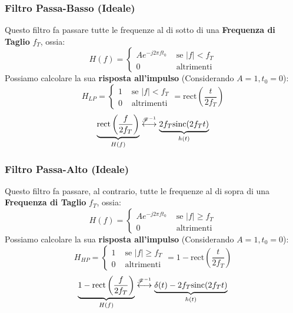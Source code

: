 \subsubsection{Filtro Passa-Basso (Ideale)}
Questo filtro fa passare tutte le frequenze al di sotto di una \textbf{Frequenza di Taglio} $f_T$, ossia:
\begin{equation}
    H(f) = \begin{cases}
        Ae^{-j2\pi ft_0} & \text{ se } |f| < f_T\\
        0 & \text{ altrimenti}
    \end{cases}
\end{equation}
Possiamo calcolare la sua \textbf{risposta all'impulso} (Considerando $A = 1, t_0 = 0$):
\begin{equation*}
    H_{LP} = \begin{cases}
        1 & \text{ se } |f| < f_T\\
        0 & \text{ altrimenti}
    \end{cases} = \text{rect}\left(\frac{t}{2f_T}\right)
\end{equation*}
\begin{equation*}
    \underbrace{\text{rect}\left(\frac{f}{2f_T}\right)}_{H(f)} \overset{{\mathscr{F}}^{-1}}{\longleftrightarrow} \underbrace{2f_T\text{sinc}(2f_Tt)}_{h(t)}
\end{equation*}

\subsubsection{Filtro Passa-Alto (Ideale)}
Questo filtro fa passare, al contrario, tutte le frequenze al di sopra di una \textbf{Frequenza di Taglio} $f_T$, ossia:
\begin{equation}
    H(f) = \begin{cases}
        Ae^{-j2\pi ft_0} & \text{ se } |f| \geq f_T\\
        0 & \text{ altrimenti}
    \end{cases}
\end{equation}
Possiamo calcolare la sua \textbf{risposta all'impulso} (Considerando $A = 1, t_0 = 0$):
\begin{equation*}
    H_{HP} = \begin{cases}
        1 & \text{ se } |f| \geq f_T\\
        0 & \text{ altrimenti}
    \end{cases} = 1 - \text{rect}\left(\frac{t}{2f_T}\right)
\end{equation*}
\begin{equation*}
    \underbrace{1 - \text{rect}\left(\frac{f}{2f_T}\right)}_{H(f)} \overset{{\mathscr{F}}^{-1}}{\longleftrightarrow} \underbrace{\delta(t) - 2f_T\text{sinc}(2f_Tt)}_{h(t)}
\end{equation*}

